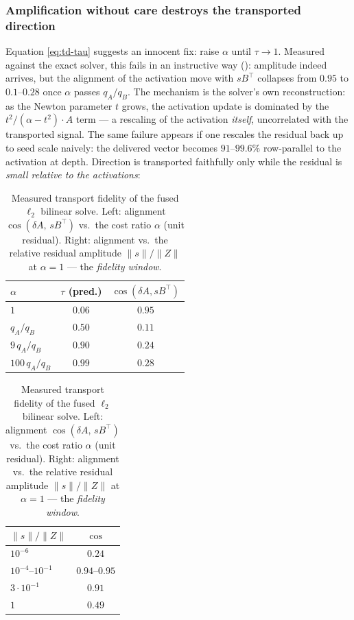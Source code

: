 \documentclass{article}
\let\cref\crtcref
\begin{document}
\subsubsection{Amplification without care destroys the transported direction}
\label{sec:td-saturation}
Equation \eqref{eq:td-tau} suggests an innocent fix: raise $\alpha$ until
$\tau\to1$. Measured against the exact solver, this fails in an instructive way
(\cref{tab:td-alpha}): amplitude indeed arrives, but the alignment of the
activation move with $sB^\top$ collapses from $0.95$ to $0.1$--$0.28$ once $\alpha$
passes $q_A/q_B$. The mechanism is the solver's own reconstruction: as the Newton
parameter $t$ grows, the activation update is dominated by the
$t^2/(\alpha-t^2)\cdot A$ term --- a rescaling of the activation \emph{itself},
uncorrelated with the transported signal. The same failure appears if one rescales
the residual back up to seed scale naively: the delivered vector becomes
$91$--$99.6\%$ row-parallel to the activation at depth. Direction is transported
faithfully only while the residual is \emph{small relative to the activations}:

\begin{table}[ht]
\centering
\caption{Measured transport fidelity of the fused $\ell_2$ bilinear solve.
Left: alignment $\cos(\delta\!A,\, sB^\top)$ vs.\ the cost ratio $\alpha$ (unit
residual). Right: alignment vs.\ the relative residual amplitude
$\lVert s\rVert/\lVert Z\rVert$ at $\alpha=1$ --- the \emph{fidelity window}.}
\label{tab:td-alpha}
\small
\begin{tabular}{lcc}
\toprule
$\alpha$ & $\tau$ (pred.) & $\cos(\delta\!A, sB^\top)$ \\
\midrule
$1$              & $0.06$ & $\mathbf{0.95}$ \\
$q_A/q_B$        & $0.50$ & $0.11$ \\
$9\,q_A/q_B$     & $0.90$ & $0.24$ \\
$100\,q_A/q_B$   & $0.99$ & $0.28$ \\
\bottomrule
\end{tabular}
\hspace{1.5em}
\begin{tabular}{lc}
\toprule
$\lVert s\rVert/\lVert Z\rVert$ & $\cos$ \\
\midrule
$10^{-6}$ & $0.24$ \\
$10^{-4}$--$10^{-1}$ & $0.94$--$0.95$ \\
$3\cdot10^{-1}$ & $0.91$ \\
$1$ & $0.49$ \\
\bottomrule
\end{tabular}
\end{table}
\end{document}
